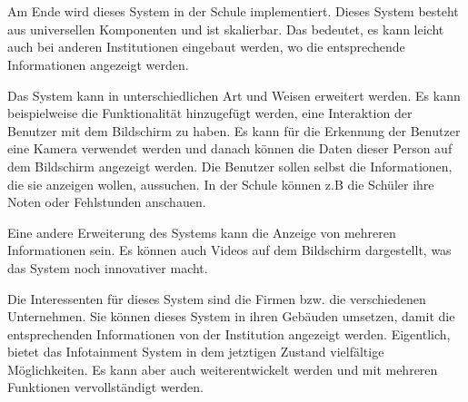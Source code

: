 \chapter{\docname}
\label{\docname}
Am Ende wird dieses System in der Schule implementiert. Dieses System besteht aus universellen Komponenten und ist skalierbar. Das bedeutet, es kann leicht auch bei anderen Institutionen eingebaut werden, wo die entsprechende Informationen angezeigt werden. 

Das System kann in unterschiedlichen Art und Weisen erweitert werden. Es kann beispielweise die Funktionalit\"at hinzugef\"ugt werden, eine Interaktion der Benutzer mit dem Bildschirm zu haben. Es kann f\"ur die Erkennung der Benutzer eine Kamera verwendet werden und danach k\"onnen die Daten dieser Person auf dem Bildschirm angezeigt werden. Die Benutzer sollen selbst die Informationen, die sie anzeigen wollen, aussuchen. In der Schule k\"onnen z.B die Sch\"uler ihre Noten oder Fehlstunden anschauen. 

Eine andere Erweiterung des Systems kann die Anzeige von mehreren Informationen sein. Es k\"onnen auch Videos auf dem Bildschirm dargestellt, was das System noch innovativer macht. 

Die Interessenten f\"ur dieses System sind die Firmen bzw. die verschiedenen Unternehmen. Sie k\"onnen dieses System in ihren Geb\"auden umsetzen, damit die entsprechenden Informationen von der Institution angezeigt werden. 
Eigentlich, bietet das Infotainment System in dem jetztigen Zustand vielf\"altige M\"oglichkeiten. Es kann aber auch weiterentwickelt werden und mit mehreren Funktionen vervollst\"andigt werden.

